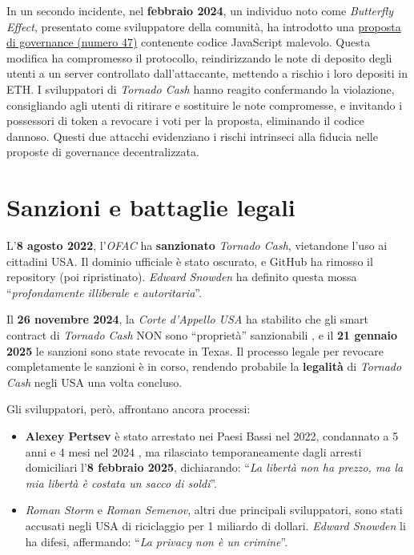In un secondo incidente, nel \textbf{febbraio 2024}, un individuo noto come \textit{Butterfly Effect}, presentato come sviluppatore della comunità, ha introdotto una \href{https://etherscan.io/address/0x228628ea3E834F1a61C2f049d010a3f1D5BA9293#code}{proposta di governance (numero 47)} contenente codice JavaScript malevolo. Questa modifica ha compromesso il protocollo, reindirizzando le note di deposito degli utenti a un server controllato dall’attaccante, mettendo a rischio i loro depositi in ETH. I sviluppatori di \textit{Tornado Cash} hanno reagito confermando la violazione, consigliando agli utenti di ritirare e sostituire le note compromesse, e invitando i possessori di token a revocare i voti per la proposta, eliminando il codice dannoso. Questi due attacchi evidenziano i rischi intrinseci alla fiducia nelle proposte di governance decentralizzata.

\section{Sanzioni e battaglie legali}
L’\textbf{8 agosto 2022}, l’\textit{OFAC} ha \textbf{sanzionato} \textit{Tornado Cash}, vietandone l’uso ai cittadini USA\cite{treasury2023}. Il dominio ufficiale è stato oscurato, e GitHub ha rimosso il repository (poi ripristinato). \textit{Edward Snowden} ha definito questa mossa “\textit{profondamente illiberale e autoritaria}”.  

Il \textbf{26 novembre 2024}, la \textit{Corte d’Appello USA} ha stabilito che gli smart contract di \textit{Tornado Cash} NON sono “proprietà” sanzionabili \cite{mayerbrown2024}, e il \textbf{21 gennaio 2025} le sanzioni sono state revocate in Texas. Il processo legale per revocare completamente le sanzioni è in corso, rendendo probabile la \textbf{legalità} di \textit{Tornado Cash} negli USA una volta concluso.

Gli sviluppatori, però, affrontano ancora processi:
\begin{itemize}
    \item \textbf{Alexey Pertsev} è stato arrestato nei Paesi Bassi nel 2022, condannato a 5 anni e 4 mesi nel 2024 \cite{ainvest2024}, ma rilasciato temporaneamente dagli arresti domiciliari l’\textbf{8 febbraio 2025}, dichiarando: “\textit{La libertà non ha prezzo, ma la mia libertà è costata un sacco di soldi}”.
    \item \textit{Roman Storm} e \textit{Roman Semenov}, altri due principali sviluppatori, sono stati accusati negli USA di riciclaggio per 1 miliardo di dollari. \textit{Edward Snowden} li ha difesi, affermando: “\textit{La privacy non è un crimine}”.
\end{itemize}


